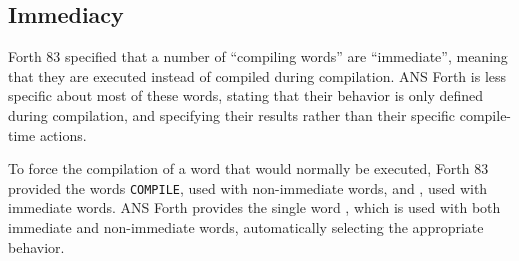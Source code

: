 \subsection{Immediacy} %
\label{diff:immediate}

Forth 83 specified that a number of ``compiling words'' are
``immediate'', meaning that they are executed instead of compiled
during compilation. ANS Forth is less specific about most of these
words, stating that their behavior is only defined during compilation,
and specifying their results rather than their specific compile-time
actions.

To force the compilation of a word that would normally be executed,
Forth 83 provided the words \texttt{COMPILE}, used with non-immediate
words, and \word{[COMPILE]}, used with immediate words. ANS Forth
provides the single word , which is used with both
immediate and non-immediate words, automatically selecting the
appropriate behavior.

